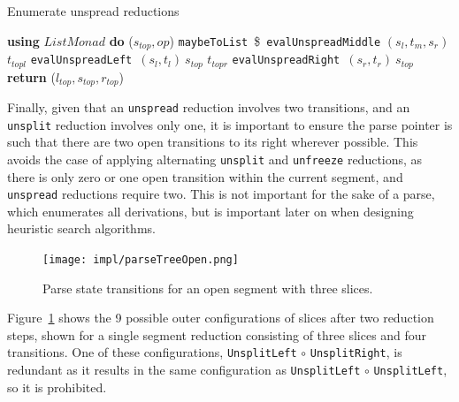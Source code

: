 \documentclass[12pt,a4paper,twoside,openright]{report} \usepackage[pdfborder={0 0 0}]{hyperref}    %
\theoremstyle{definition} \newtheorem{definition}{Definition}[section]
\begin{document}
  \begin{algorithm}[h] \caption{Enumerate unspread reductions} \label{code:heuristic0}
    \begin{algorithmic}[1]  \State \textbf{using} $List Monad$
      \textbf{do} \State ($s_{top}, op$) \gets \texttt{maybeToList}~\$~\texttt{evalUnspreadMiddle} $(s_l, t_m, s_r)$
      \State $t_{topl}$ \gets \texttt{evalUnspreadLeft}~$(s_l, t_l)~s_{top}$ \State $t_{topr}$ \gets
      \texttt{evalUnspreadRight}~$(s_r, t_r)~s_{top}$ \State \textbf{return} ($l_{top}, s_{top}, r_{top}$) \EndFunction
    \end{algorithmic} \end{algorithm}

    Finally, given that an \texttt{unspread} reduction involves two transitions, and an \texttt{unsplit} reduction
    involves only one, it is important to ensure the parse pointer is such that there are two open transitions to its
    right wherever possible. This avoids the case of applying alternating \texttt{unsplit} and \texttt{unfreeze}
    reductions, as there is only zero or one open transition within the current segment, and \texttt{unspread}
    reductions require two. This is not important for the sake of a parse, which enumerates all derivations, but is
    important later on when designing heuristic search algorithms. \footnotemark 

    \begin{figure}[h] \centering \texttt{[image: impl/parseTreeOpen.png]} \caption{Parse state
    transitions for an open segment with three slices.} \label{fig:statetrans} \end{figure}


    Figure~\ref{fig:statetrans} shows the 9 possible outer configurations of slices after two reduction steps, shown for
    a single segment reduction consisting of three slices and four transitions. One of these configurations,
    \texttt{UnsplitLeft} $\circ$ \texttt{UnsplitRight}, is redundant as it results in the same configuration as
    \texttt{UnsplitLeft} $\circ$ \texttt{UnsplitLeft}, so it is prohibited.
\end{document}
